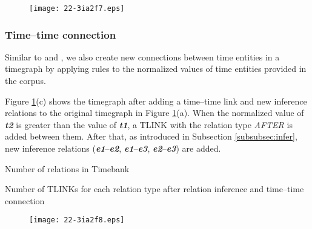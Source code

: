 \documentclass[english]{jnlp_1.4}
\begin{document}
\begin{figure}[t]
\begin{center}
\texttt{[image: 22-3ia2f7.eps]}
\end{center}
\label{fig:infertg}
\end{figure}
\label{fig:tg} 
\label{fig:infer} 
\label{fig:infertt} 


\subsubsection{Time--time connection}
\label{subsubsec:time--time}

Similar to  and , we also create new connections between time entities in a timegraph by applying rules to the normalized values of time entities provided in the corpus.

Figure \ref{fig:infertg}(c) shows the timegraph after adding a time--time link and new inference relations to the original timegraph in Figure \ref{fig:infertg}(a).
When the normalized value of \emph{\textbf{t2}} is greater than the value of \emph{\textbf{t1}}, a TLINK with the relation type \emph{\footnotesize AFTER} is added between them. 
After that, as introduced in Subsection \ref{subsubsec:infer}, new inference relations (\emph{\textbf{e1}}--\emph{\textbf{e2}}, \emph{\textbf{e1}}--\emph{\textbf{e3}}, \emph{\textbf{e2}}--\emph{\textbf{e3}}) are added.

\begin{table}[b]
\caption{Number of relations in Timebank}
\label{tab:te2_data}

\end{table}

\begin{table}[b]
\caption{Number of TLINKs for each relation type after relation inference and time--time connection}
\label{tab:labeldstr}

\end{table}

\begin{figure}[b]
\begin{center}
\texttt{[image: 22-3ia2f8.eps]}
\end{center}
\label{fig:histnumtlink}
\end{figure}
\end{document}
